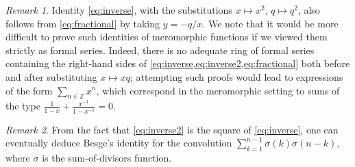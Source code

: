 \documentclass[reqno,11pt]{amsart}
\newtheorem{corollary}[theorem]{Corollary}
\theoremstyle{definition}
\theoremstyle{remark}
\newtheorem*{remark}{Remark}
\numberwithin{equation}{section}
\newcommand{\Z}{\mathbb{Z}}
\newcommand{\la}{\left\langle}
\newcommand{\ra}{\right\rangle}
\newcommand{\fix}[1]{\textcolor{blue}{\large (#1)\normalsize}}
\begin{document}
\begin{remark}
Identity \cref{eq:inverse}, with the substitutions $x \mapsto x^2$, $q \mapsto q^2$, also follows from \cref{eq:fractional} by taking $y = -q/x$.  We note that it would be more difficult to prove such identities of meromorphic functions if we viewed them strictly as formal series. Indeed, there is no adequate ring of formal series containing the right-hand sides of \cref{eq:inverse,eq:inverse2,eq:fractional} both before and after substituting $x \mapsto xq$; attempting such proofs would lead to expressions of the form $\sum_{n \in \Z} x^n$, which correspond in the meromorphic setting to sums of the type $\frac{1}{1-x} + \frac{x^{-1}}{1-x^{-1}} = 0$.
\end{remark}

\begin{remark}
From the fact that \cref{eq:inverse2} is the square of \cref{eq:inverse}, one can eventually deduce Besge's identity for the convolution $\sum_{k=1}^{n-1} \sigma(k) \sigma(n-k)$, where $\sigma$ is the sum-of-divisors function.
\end{remark}
\end{document}
